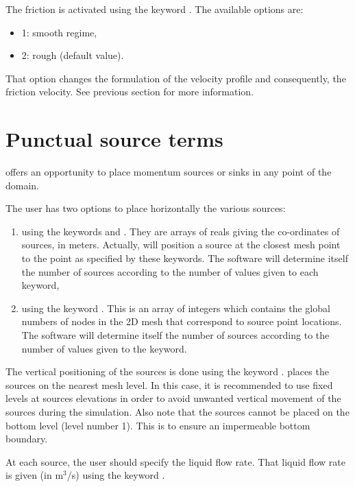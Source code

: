 The friction is activated using the keyword
.
The available options are:

\begin{itemize}
\item 1: smooth regime,

\item 2: rough (default value).
\end{itemize}

That option changes the formulation of the velocity profile and consequently,
the friction velocity. See previous section for more information.

\section{Punctual source terms}
\label{sec:srcfile}
 offers an opportunity to place momentum sources or sinks in any
point of the domain.

The user has two options to place horizontally the various sources:
\begin{enumerate}
\item  using the keywords  and
. They are arrays of reals giving the co-ordinates
of sources, in meters. Actually,  will position a source at the
closest mesh point to the point as specified by these keywords. The software
will determine itself the number of sources according to the number of values
given to each keyword,
\item using the keyword .
This is an array of integers which contains the global numbers of nodes
in the 2D mesh that correspond to source point locations. The software
will determine itself the number of sources according to the number of values
given to the keyword.
\end{enumerate}

The vertical positioning of the sources is done using the keyword
.  places the sources on the nearest
mesh level. In this case, it is recommended to use fixed levels at sources
elevations in order to avoid unwanted vertical movement of the sources during
the simulation. Also note that the sources cannot be placed on the bottom level
(level number 1). This is to ensure an impermeable bottom boundary.

At each source, the user should specify the liquid flow rate. That liquid flow
rate is given (in m${}^{3}$/s) using the keyword .

